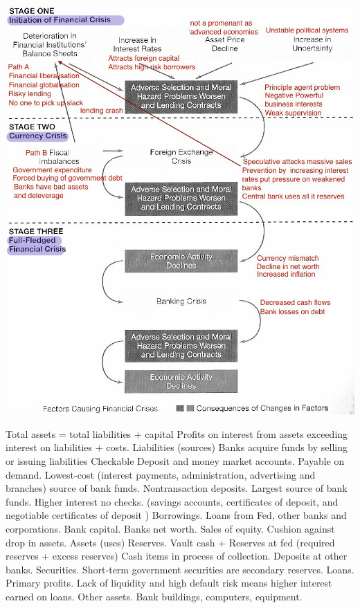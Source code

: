 \documentclass[12pt]{examnotes}
\begin{document}
\includegraphics[scale=0.5]{./imgs/101.jpg}


\ra Total assets = total liabilities + capital
\ra Profits on interest from assets exceeding interest on liabilities + costs.
Liabilities (sources)
\ra Banks acquire funds by selling or issuing liabilities
 Checkable Deposit and money market accounts. Payable on demand. Lowest-cost (interest payments, administration, advertising and branches) source of bank funds.
 Nontransaction deposits. Largest source of bank funds. Higher interest no checks. (savings accounts, certificates of deposit,  and negotiable certificates of deposit )
 Borrowings. Loans from Fed, other banks and corporations.
 Bank capital. Banks net worth. Sales of equity. Cushion against drop in assets.
Assets (uses)
 Reserves. Vault cash + Reserves at fed (required reserves + excess reserves)
 Cash items in process of collection. 
 Deposits at other banks. 
 Securities. Short-term government securities are secondary reserves.
 Loans. Primary profits. Lack of liquidity and high default risk means higher interest earned on loans.
 Other assets. Bank buildings, computers, equipment.
\end{document}
